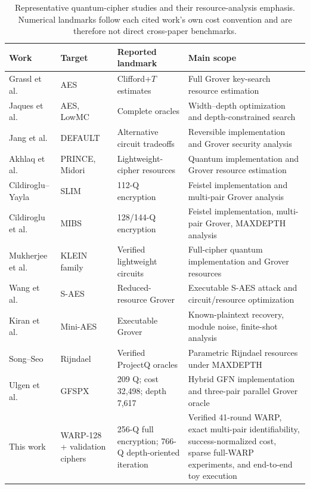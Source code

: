 \documentclass[pdflatex,sn-nature]{sn-jnl}
\theoremstyle{thmstyleone}
\theoremstyle{thmstyletwo}
\begin{document}
\begin{table}[htbp]
\centering
\caption{Representative quantum-cipher studies and their resource-analysis emphasis. Numerical landmarks follow each cited work's own cost convention and are therefore not direct cross-paper benchmarks.}
\label{tab:related_comparison}
\scriptsize
\setlength{\tabcolsep}{4pt}
\begin{tabularx}{\textwidth}{@{}L{2.25cm}L{1.95cm}L{3.05cm}X@{}}
\toprule
Work & Target & Reported landmark & Main scope\\
\midrule
Grassl et al.~\cite{Grassl2016} & AES & Clifford+$T$ estimates & Full Grover key-search resource estimation\\
Jaques et al.~\cite{Jaques2020} & AES, LowMC & Complete oracles & Width--depth optimization and depth-constrained search\\
Jang et al.~\cite{JangDefault2025} & DEFAULT & Alternative circuit tradeoffs & Reversible implementation and Grover security analysis\\
Akhlaq et al.~\cite{Akhlaq2024} & PRINCE, Midori & Lightweight-cipher resources & Quantum implementation and Grover resource estimation\\
Cildiroglu--Yayla~\cite{SLIM2025} & SLIM & 112-Q encryption & Feistel implementation and multi-pair Grover analysis\\
Cildiroglu et al.~\cite{MIBS2026} & MIBS & 128/144-Q encryption & Feistel implementation, multi-pair Grover, MAXDEPTH analysis\\
Mukherjee et al.~\cite{KLEIN2026} & KLEIN family & Verified lightweight circuits & Full-cipher quantum implementation and Grover resources\\
Wang et al.~\cite{Wang2025} & S-AES & Reduced-resource Grover & Executable S-AES attack and circuit/resource optimization\\
Kiran et al.~\cite{Kiran2026} & Mini-AES & Executable Grover & Known-plaintext recovery, module noise, finite-shot analysis\\
Song--Seo~\cite{SongSeo2026} & Rijndael & Verified ProjectQ oracles & Parametric Rijndael resources under MAXDEPTH\\
Ulgen et al.~\cite{Ulgen2026} & GFSPX & 209 Q; cost 32,498; depth 7,617 & Hybrid GFN implementation and three-pair parallel Grover oracle\\
This work & WARP-128 + validation ciphers & 256-Q full encryption; 766-Q depth-oriented iteration & Verified 41-round WARP, exact multi-pair identifiability, success-normalized cost, sparse full-WARP experiments, and end-to-end toy execution\\
\bottomrule
\end{tabularx}
\end{table}
\end{document}
